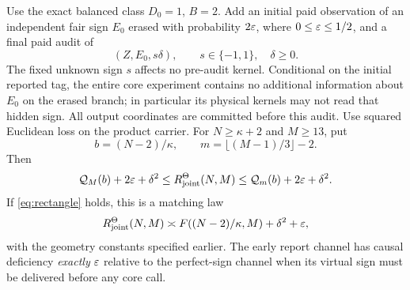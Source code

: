 \begin{theorem}\label{thm:joint}
Use the exact balanced class $D_0=1$, $B=2$. Add an initial paid observation of an independent fair sign $E_0$ erased with probability $2\varepsilon$, where $0\le\varepsilon\le1/2$, and a final paid audit of
\[
 (Z,E_0,s\delta),\qquad s\in\{-1,1\},\quad\delta\ge0.
\]
The fixed unknown sign $s$ affects no pre-audit kernel. Conditional on the initial reported tag, the entire core experiment contains no additional information about $E_0$ on the erased branch; in particular its physical kernels may not read that hidden sign. All output coordinates are committed before this audit. Use squared Euclidean loss on the product carrier. For $N\ge\kappa+2$ and $M\ge13$, put
\[
 b=(N-2)/\kappa,\qquad m=\lfloor(M-1)/3\rfloor-2.
\]
Then
\begin{equation}\label{eq:joint-bounds}
 \mathcal Q_M(b)+2\varepsilon+\delta^2
 \le R_{\rm joint}^\Theta(N,M)
 \le\mathcal Q_m(b)+2\varepsilon+\delta^2.
\end{equation}
If \eqref{eq:rectangle} holds, this is a matching law
\begin{equation}\label{eq:joint-rate}
 R_{\rm joint}^\Theta(N,M)
 \asymp F((N-2)/\kappa,M)+\delta^2+\varepsilon,
\end{equation}
with the geometry constants specified earlier. The early report channel has causal deficiency \emph{exactly} $\varepsilon$ relative to the perfect-sign channel when its virtual sign must be delivered before any core call.
\end{theorem}
